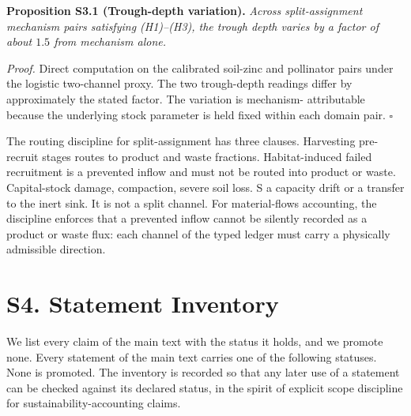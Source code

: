 \documentclass[11pt]{article}
\begin{document}
\textbf{Proposition S3.1 (Trough-depth variation).} \emph{Across split-assignment mechanism pairs satisfying (H1)--(H3), the trough depth varies by a factor of about \(1.5\) from mechanism alone.}

\emph{Proof.} Direct computation on the calibrated soil-zinc and pollinator pairs under the logistic two-channel proxy. The two trough-depth readings differ by approximately the stated factor. The variation is mechanism- attributable because the underlying stock parameter is held fixed within each domain pair. \(\square\)

The routing discipline for split-assignment has three clauses. Harvesting pre-recruit stages routes to product and waste fractions. Habitat-induced failed recruitment is a prevented inflow and must not be routed into product or waste. Capital-stock damage, compaction, severe soil loss. S a capacity drift or a transfer to the inert sink. It is not a split channel. For material-flows accounting, the discipline enforces that a prevented inflow cannot be silently recorded as a product or waste flux: each channel of the typed ledger must carry a physically admissible direction.

\vspace{0.8em}

\section*{S4. Statement Inventory}\label{s4-statement-inventory}

We list every claim of the main text with the status it holds, and we promote none. Every statement of the main text carries one of the following statuses. None is promoted. The inventory is recorded so that any later use of a statement can be checked against its declared status, in the spirit of explicit scope discipline for sustainability-accounting claims.
\end{document}
